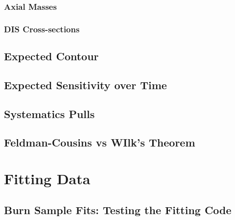 \label{subsubsec:axial_masses}
\subsubsection{Axial Masses}

\label{subsubsec:dis_systematics}
\subsubsection{DIS Cross-sections}

\label{subsec:detector_systematics}


\label{sec:likelihood}


\label{sec:tau_parametrization}


\label{sec:mc_expectation}


\label{subsec:sensitivity}
\subsection{Expected Contour}

\label{subsec:sensitivity_vs_time}
\subsection{Expected Sensitivity over Time}

\label{subsec:systematic_pulls}
\subsection{Systematics Pulls}

\label{subsec:wilks}
\subsection{Feldman-Cousins vs WIlk's Theorem}

\label{sec:fitting_data}
\section{Fitting Data}

\label{subsec:burn_sample}
\subsection{Burn Sample Fits: Testing the Fitting Code}

